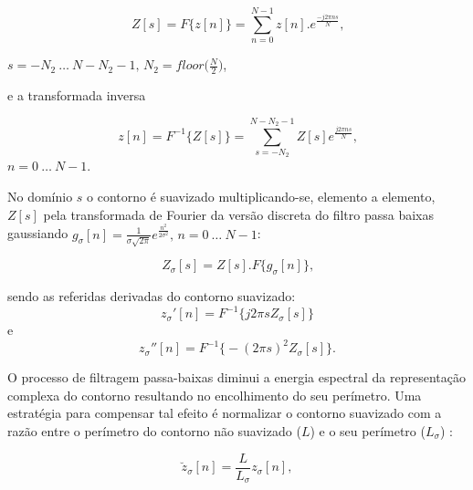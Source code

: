 \begin{equation}
Z[s] = F\big\{z[n]\big\} = \sum\limits_{n=0}^{N-1}z[n].e^{\frac{-j2\pi ns}{N}} \text{,}
\end{equation}

$s = -N_{2}\: \ldots \: N-N_{2}-1\text{, }N_{2}=floor\big(\frac{N}{2}\big)$,

e a transformada inversa 

\begin{equation}
z[n] = F^{-1}\big\{Z[s]\big\} = \sum\limits_{s = -N_{2}}^{N-N_{2}-1}Z[s]e^{\frac{j2\pi n s}{N}}\text{,}
\end{equation}
 $ n = 0\: \ldots \: N-1$.
  
No domínio $s$ o contorno é suavizado multiplicando-se, elemento a elemento, $Z[s]$ pela transformada de Fourier da versão discreta do filtro passa baixas gaussiando $g_\sigma[n] = \frac{1}{\sigma\sqrt{2\pi}}e^{\frac{n^2}{2\sigma^2}}\text{, } 
n = 0 \: \ldots \: N-1$:


\begin{equation}
Z_\sigma[s] = Z[s].F\big\{g_\sigma[n]\big\}\text{,}
\end{equation}

 sendo as referidas derivadas do contorno suavizado:
\begin{equation}
z_\sigma'[n] = F^{-1}\big\{j2\pi s Z_\sigma[s]\big\}
\end{equation} e
\begin{equation}
z_\sigma''[n] = F^{-1}\big\{-(2\pi s)^2 Z_\sigma[s]\big\}\text{.}
\end{equation}

O processo de filtragem passa-baixas diminui a energia espectral da representação complexa do contorno resultando no encolhimento do seu perímetro. Uma estratégia para compensar tal efeito é normalizar o contorno suavizado com a razão entre o perímetro do contorno não suavizado ($L$) e o seu perímetro ($L_{\sigma}$) \cite{Cesar:1996,Costa:1997}:

\begin{equation}
\breve{z}_{\sigma}[n] = \frac{L}{L_{\sigma}}z_{\sigma}[n],
\end{equation}

